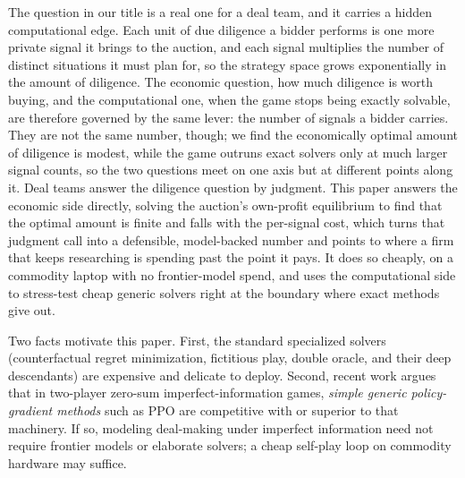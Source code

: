 \documentclass[11pt,a4paper]{article}
\begin{document}
The question in our title is a real one for a deal team, and it carries a hidden
computational edge. Each unit of due diligence a bidder performs is one more private
signal it brings to the auction, and each signal multiplies the number of distinct
situations it must plan for, so the strategy space grows exponentially in the amount of
diligence. The economic question, how much diligence is worth buying, and the
computational one, when the game stops being exactly solvable, are therefore governed by
the same lever: the number of signals a bidder carries. They are not the same number,
though; we find the economically optimal amount of diligence is modest, while the game
outruns exact solvers only at much larger signal counts, so the two questions meet on one
axis but at different points along it. Deal teams answer the diligence question by judgment.
This paper answers the economic side directly, solving the auction's own-profit
equilibrium to find that the optimal amount is finite and falls with the per-signal cost,
which turns that judgment call into a defensible, model-backed number and points to where
a firm that keeps researching is spending past the point it pays. It does so cheaply, on
a commodity laptop with no frontier-model spend, and uses the computational side to
stress-test cheap generic solvers right at the boundary where exact methods give out.

Two facts motivate this paper. First, the standard specialized solvers
(counterfactual regret minimization, fictitious play, double oracle, and their deep
descendants) are expensive and delicate to deploy. Second, recent work
\citep{rudolph2026} argues that in two-player zero-sum imperfect-information games,
\emph{simple generic policy-gradient methods} such as PPO are competitive with or
superior to that machinery. If so, modeling deal-making under imperfect information
need not require frontier models or elaborate solvers; a cheap self-play loop on
commodity hardware may suffice.
\end{document}
